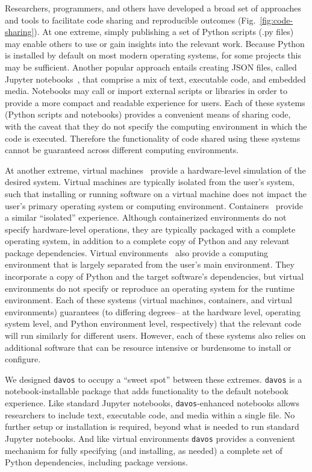 \documentclass[preprint,12pt,a4paper]{elsarticle}
\begin{document}
Researchers, programmers, and others have developed a broad
set of approaches and tools to facilitate code sharing and
reproducible outcomes (Fig.~\ref{fig:code-sharing}).  At one
extreme, simply publishing a set of Python scripts (.py files) may
enable others to use or gain insights into the relevant work.  Because
Python is installed by default on most modern operating systems, for
some projects this may be sufficient.  Another popular approach
entails creating JSON files, called Jupyter
notebooks~\citep{KluyEtal16}, that comprise a mix of text, executable
code, and embedded media.  Notebooks may call or import external
scripts or libraries in order to provide a more compact and readable
experience for users.  Each of these systems (Python scripts and
notebooks) provides a convenient means of sharing code, with the
caveat that they do not specify the computing environment in which the
code is executed.  Therefore the functionality of code shared using
these systems cannot be guaranteed across different computing
environments.

At another extreme, virtual machines~\citep{Gold74, AltiEtal05,
  Rose99} provide a hardware-level simulation of the desired system.
Virtual machines are typically isolated from the user's system, such
that installing or running software on a virtual machine does not
impact the user's primary operating system or computing environment.
Containers~\citep[e.g.,][]{Merk14, KurtEtal17} provide a similar
``isolated'' experience.  Although containerized environments do not
specify hardware-level operations, they are typically packaged with a
complete operating system, in addition to a complete copy of Python
and any relevant package dependencies.  Virtual
environments~\citep[e.g.,][]{Anac12} also provide a computing
environment that is largely separated from the user's main
environment.  They incorporate a copy of Python and the target
software's dependencies, but virtual environments do not specify or
reproduce an operating system for the runtime environment.  Each of
these systems (virtual machines, containers, and virtual environments)
guarantees (to differing degrees-- at the hardware level, operating
system level, and Python environment level, respectively) that the
relevant code will run similarly for different users.  However, each
of these systems also relies on additional software that can be
resource intensive or burdensome to install or configure.

We designed \texttt{davos} to occupy a ``sweet spot'' between these
extremes.  \texttt{davos} is a notebook-installable package that adds
functionality to the default notebook experience.  Like standard
Jupyter notebooks, \texttt{davos}-enhanced notebooks allows
researchers to include text, executable code, and media within a
single file.  No further setup or installation is required, beyond
what is needed to run standard Jupyter notebooks.  And like virtual
environments \texttt{davos} provides a convenient mechanism for fully
specifying (and installing, as needed) a complete set of Python
dependencies, including package versions.
\end{document}
